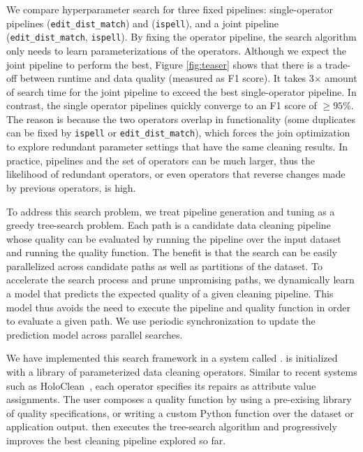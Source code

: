We compare hyperparameter search for three fixed pipelines:  single-operator pipelines (\texttt{edit\_dist\_match}) and (\texttt{ispell}), and a joint pipeline (\texttt{edit\_dist\_match}, \texttt{ispell}).  By fixing the operator pipeline, the search algorithm only needs to learn parameterizations of the operators.  Although we expect the joint pipeline to perform the best, Figure \ref{fig:teaser} shows that there is a trade-off between runtime and data quality (measured as F1 score).  It takes 3$\times$ amount of search time for the joint pipeline to exceed the best single-operator pipeline.    In contrast, the single operator pipelines quickly converge to an F1 score of $\ge95\%$.  The reason is because the two operators overlap in functionality (some duplicates can be fixed by \texttt{ispell} or \texttt{edit\_dist\_match}), which forces the join optimization to explore redundant parameter settings that have the same cleaning results.  In practice, pipelines and the set of operators can be much larger, thus the likelihood of redundant operators, or even operators that reverse changes made by previous operators, is high.



To address this search problem, we treat pipeline generation and tuning as a greedy tree-search problem.   Each path is a candidate data cleaning pipeline whose quality can be evaluated by running the pipeline over the input dataset and running the quality function.  The benefit is that the search can be easily parallelized across candidate paths as well as partitions of the dataset.  To accelerate the search process and prune unpromising paths, we dynamically learn a model that predicts the expected quality of a given cleaning pipeline.  This model thus avoids the need to execute the pipeline and quality function in order to evaluate a given path.    We use periodic synchronization to update the prediction model across parallel searches.  

We have implemented this search framework in a system called \sys.  \sys is initialized with a library of parameterized data cleaning operators.  Similar to recent systems such as HoloClean~\cite{rekatsinas2017holoclean}, each operator specifies its repairs as attribute value assignments.  The user composes a quality function by using a pre-exising library of quality specifications, or writing a custom Python function over the dataset or application output.  \sys then executes the tree-search algorithm and progressively improves the best cleaning pipeline explored so far.  

